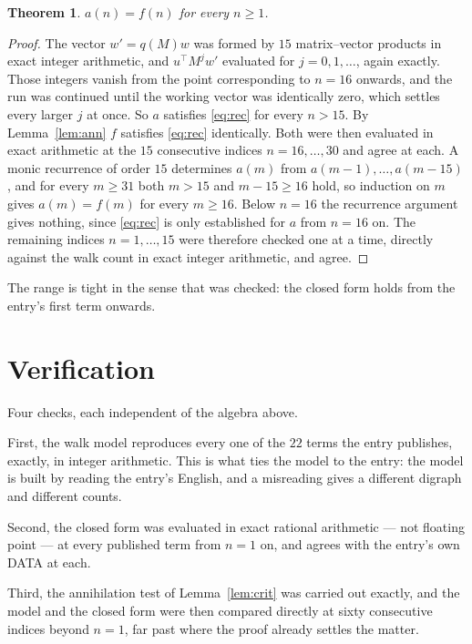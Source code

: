\documentclass[11pt,a4paper]{article}
\theoremstyle{plain}
\newtheorem{theorem}{Theorem}
\theoremstyle{definition}
\begin{document}
\begin{theorem}
$a(n)=f(n)$ for every $n\ge1$.
\end{theorem}

\begin{proof}
The vector $w'=q(M)w$ was formed by $15$ matrix--vector products in exact integer
arithmetic, and $u^{\!\top}M^{j}w'$ evaluated for $j=0,1,\dots$, again exactly. Those integers
vanish from the point corresponding to $n=16$ onwards, and the run was continued until the
working vector was identically zero, which settles every larger $j$ at once. So $a$ satisfies
\eqref{eq:rec} for every $n>15$. By Lemma~\ref{lem:ann} $f$ satisfies \eqref{eq:rec}
identically. Both were then evaluated in exact arithmetic at the $15$ consecutive indices
$n=16,\dots,30$ and agree at each. A monic recurrence of order $15$
determines $a(m)$ from $a(m-1),\dots,a(m-15)$, and for every $m\ge31$ both
$m>15$ and $m-15\ge16$ hold, so induction on $m$ gives $a(m)=f(m)$ for every
$m\ge16$.
Below $n=16$ the recurrence argument gives nothing, since \eqref{eq:rec} is only
established for $a$ from $n=16$ on. The remaining indices $n=1,\dots,15$ were
therefore checked one at a time, directly against the walk count in exact integer arithmetic,
and agree.
\end{proof}

The range is tight in the sense that was checked: the closed form holds from the entry's first term onwards.

\section{Verification}

Four checks, each independent of the algebra above.

First, the walk model reproduces every one of the $22$ terms the entry publishes,
exactly, in integer arithmetic. This is what ties the model to the entry: the model is built
by reading the entry's English, and a misreading gives a different digraph and different
counts.

Second, the closed form was evaluated in exact rational arithmetic --- not floating point ---
at every published term from $n=1$ on, and agrees with the entry's own DATA at each.

Third, the annihilation test of Lemma~\ref{lem:crit} was carried out exactly, and the model
and the closed form were then compared directly at sixty consecutive indices beyond
$n=1$, far past where the proof already settles the matter.
\end{document}
